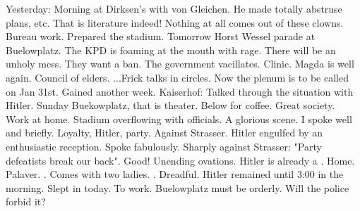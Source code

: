 Yesterday: Morning at Dirksen's with von Gleichen. He made totally abstruse plans,  etc. That is literature indeed! Nothing at all comes out of these clowns. Bureau work. Prepared the stadium. Tomorrow Horst Wessel parade at Buelowplatz. The KPD is foaming at the mouth with rage. There will be an unholy mess. They want a ban. The government vacillates. Clinic. Magda is well again. Council of elders. ...Frick talks in circles. Now the plenum is to be called on Jan 31st. Gained another week. Kaiserhof: Talked through the situation with Hitler. Sunday Buekowplatz, that is theater. Below for coffee. Great society. Work at home. Stadium overflowing with officials. A glorious scene. I spoke well and briefly. Loyalty, Hitler, party. Against Strasser. Hitler engulfed by an enthusiastic reception. Spoke fabulously. Sharply against Strasser: "Party defeatists break our back". Good! Unending ovations. Hitler is already a . Home. Palaver. . Comes with two ladies. . Dreadful. Hitler remained until 3:00 in the morning. Slept in today. To work. Buelowplatz must be orderly. Will the police forbid it?
